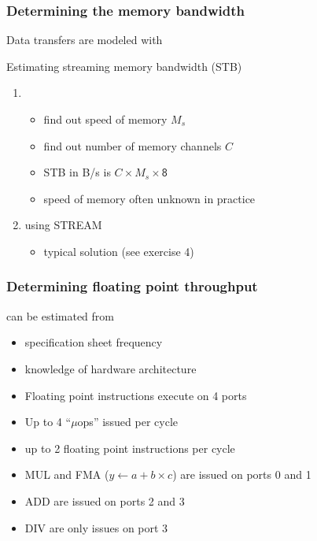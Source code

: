 \documentclass[dvipsnames,presentation,aspectratio=169,14pt]{beamer}
\begin{document}
\begin{frame}
  \frametitle{Determining the memory bandwidth }
  Data transfers are modeled with 

  \begin{exampleblock}{Estimating streaming memory bandwidth (STB)}
    \begin{enumerate}[itemsep=5pt]
    \item {}
      \begin{itemize}[itemsep=3pt]
      \item find out speed of memory $M_{s}$
      \item find out number of memory channels $C$
      \item STB in B/s is $C \times M_{s} \times \mathsf 8$
      \item[\textcolor{Red}{\blacktriangleright}] speed of memory often unknown
        in practice
      \end{itemize}
    \item {} using STREAM
      \begin{itemize}
      \item typical solution (see exercise 4)
      \end{itemize}
    \end{enumerate}
  \end{exampleblock}
\end{frame}

\begin{frame}
  \frametitle{Determining floating point throughput}
   can be estimated from
  \begin{itemize}[4pt]
  \item specification sheet frequency
  \item knowledge of hardware architecture
  \end{itemize}

  \vskip 11pt

  \begin{itemize}[itemsep=4pt]
  \item Floating point instructions execute on 4 ports
  \item Up to 4 ``$\mu$ops'' issued per cycle
  \item up to 2 floating point instructions per cycle
  \item MUL and FMA ($y \gets a + b\times c$) are issued on ports 0 and 1
  \item ADD are issued on ports 2 and 3
  \item DIV are only issues on port 3
  \end{itemize}
\end{frame}
\end{document}
